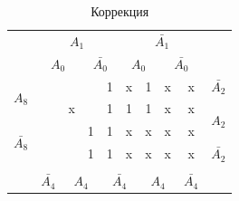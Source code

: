 \documentclass[a4paper,14pt]{article}
\begin{document}
\begin{table}[H]
	\begin{center}
		\caption{Коррекция}
		\begin{tabular}{cccccccccc}
			& \multicolumn{4}{c}{$A_1$} & \multicolumn{4}{c}{$\bar{A_1}$} &  \\
			& \multicolumn{2}{c}{$A_0$} & \multicolumn{2}{c}{$\bar{A_0}$} & \multicolumn{2}{c}{$A_0$} & \multicolumn{2}{c}{$\bar{A_0}$} &  \\ \cline{2-9}
			\multicolumn{1}{c|}{\multirow{2}{*}{$A_8$}} & \multicolumn{1}{c|}{} & \multicolumn{1}{c|}{} & \multicolumn{1}{c|}{} & \multicolumn{1}{c|}{1} & \multicolumn{1}{c|}{x} & \multicolumn{1}{c|}{1} & \multicolumn{1}{c|}{x} & \multicolumn{1}{c|}{x} & $\bar{A_2}$ \\ \cline{2-9}
			\multicolumn{1}{c|}{} & \multicolumn{1}{c|}{} & \multicolumn{1}{c|}{x} & \multicolumn{1}{c|}{} & \multicolumn{1}{c|}{1} & \multicolumn{1}{c|}{1} & \multicolumn{1}{c|}{1} & \multicolumn{1}{c|}{x} & \multicolumn{1}{c|}{x} & \multirow{2}{*}{$A_2$} \\ \cline{2-9}
			\multicolumn{1}{c|}{\multirow{2}{*}{$\bar{A_8}$}} & \multicolumn{1}{c|}{} & \multicolumn{1}{c|}{} & \multicolumn{1}{c|}{1} & \multicolumn{1}{c|}{1} & \multicolumn{1}{c|}{x} & \multicolumn{1}{c|}{x} & \multicolumn{1}{c|}{x} & \multicolumn{1}{c|}{x} &  \\ \cline{2-9}
			\multicolumn{1}{c|}{} & \multicolumn{1}{c|}{} & \multicolumn{1}{c|}{} & \multicolumn{1}{c|}{1} & \multicolumn{1}{c|}{1} & \multicolumn{1}{c|}{x} & \multicolumn{1}{c|}{x} & \multicolumn{1}{c|}{x} & \multicolumn{1}{c|}{x} & $\bar{A_2}$ \\ \cline{2-9}
			\\
			& $\bar{A_4}$ & \multicolumn{2}{c}{$A_4$} & \multicolumn{2}{c}{$\bar{A_4}$} & \multicolumn{2}{c}{$A_4$} & $\bar{A_4}$ & 
		\end{tabular}
	\end{center}
\end{table}
\end{document}
